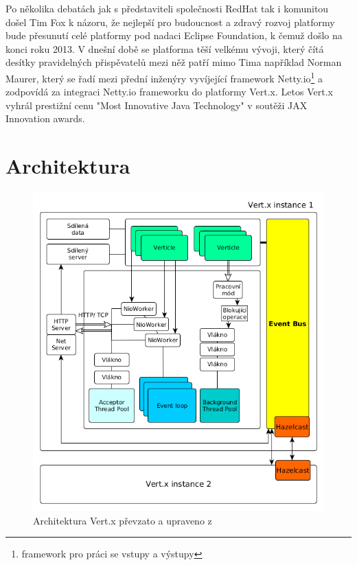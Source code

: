 Po několika debatách jak s představiteli společnosti RedHat tak i komunitou došel Tim Fox k názoru, že nejlepší pro budoucnost a zdravý rozvoj platformy bude přesunutí celé platformy pod nadaci Eclipse Foundation, k čemuž došlo na konci roku 2013. V dnešní době se platforma těší velkému vývoji, který čítá desítky  pravidelných přispěvatelů mezi něž patří mimo Tima například Norman Maurer, který se řadí mezi přední inženýry vyvíjející framework Netty.io\footnote{framework pro práci se vstupy a výstupy} a zodpovídá za integraci Netty.io frameworku do platformy Vert.x\cite{vertxNodejs}.
Letos Vert.x vyhrál prestižní cenu "Most Innovative Java Technology" v soutěži JAX Innovation awards\citep{JAX}.

\section{Architektura}

\begin{figure}
\begin{centering}
\includegraphics[scale=0.55]{obrazky/architecture_vertx}
\par\end{centering}
\caption{Architektura Vert.x převzato a upraveno z \cite{vertxArchitectureDiagram} \label{fig:vertxArchitectureDiagram}}
\end{figure}

